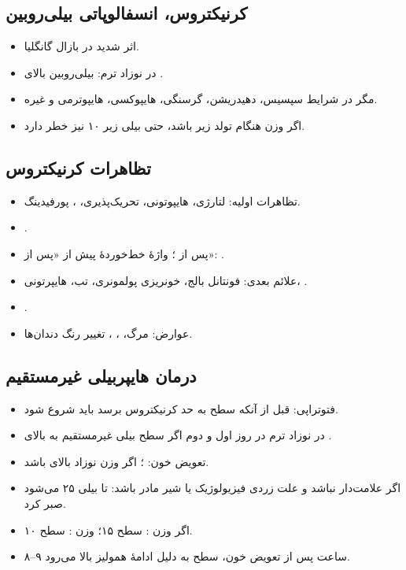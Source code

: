 \documentclass[12pt,a4paper]{article}
\begin{document}
\subsection*{کرنیکتروس، انسفالوپاتی بیلی‌روبین}
\begin{itemize}
\item اثر شدید در بازال گانگلیا.
\item در نوزاد ترم: بیلی‌روبین بالای .
\item مگر در شرایط سپسیس، دهیدریشن، گرسنگی، هایپوکسی، هایپوترمی و غیره.
\item اگر وزن هنگام تولد زیر  باشد، حتی بیلی زیر ۱۰ نیز خطر دارد.
\end{itemize}
\subsection*{تظاهرات کرنیکتروس}
\begin{itemize}
\item تظاهرات اولیه: لتارژی، هایپوتونی، تحریک‌پذیری، ، پورفیدینگ.
\item {}.
\item پس از ؛ واژهٔ خط‌خوردهٔ پیش از «پس از»:
.
\item علائم بعدی: فونتانل بالج، خونریزی پولمونری، تب، هایپرتونی، .
\item {}.
\item عوارض: مرگ، ، ، تغییر رنگ دندان‌ها.
\end{itemize}
\subsection*{درمان هایپربیلی غیرمستقیم}
\begin{itemize}
\item فتوتراپی: قبل از آنکه سطح  به حد کرنیکتروس برسد باید شروع شود.
\item در نوزاد ترم در روز اول و دوم اگر سطح بیلی غیرمستقیم به بالای .
\item تعویض خون: ؛ اگر وزن نوزاد بالای  باشد.
\item اگر علامت‌دار نباشد و علت زردی فیزیولوژیک یا شیر مادر باشد:
تا بیلی ۲۵ می‌شود صبر کرد.
\item اگر وزن : سطح ۱۵؛ وزن : سطح ۱۰.
\item ۸–۹ ساعت پس از تعویض خون، سطح  به دلیل ادامهٔ همولیز بالا می‌رود.
\end{itemize}
\end{document}
